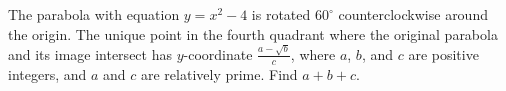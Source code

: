 The parabola with equation $y = x^2 - 4$ is rotated $60^\circ$ counterclockwise around the origin. The unique point in the fourth quadrant where the original parabola and its image intersect has $y$-coordinate $\frac{a - \sqrt{b}}{c}$, where $a$, $b$, and $c$ are positive integers, and $a$ and $c$ are relatively prime. Find $a + b + c$.